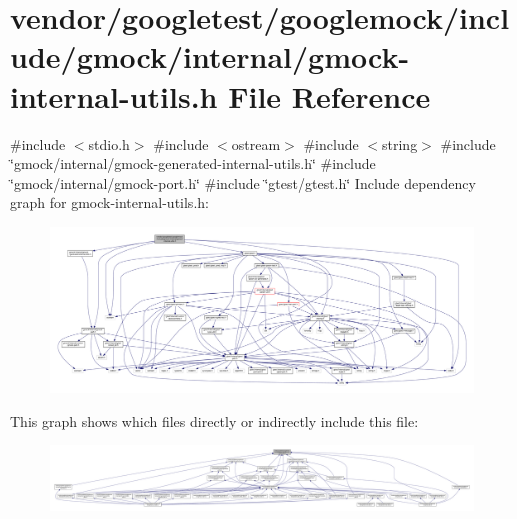 \hypertarget{gmock-internal-utils_8h}{}\section{vendor/googletest/googlemock/include/gmock/internal/gmock-\/internal-\/utils.h File Reference}
\label{gmock-internal-utils_8h}
{\ttfamily \#include $<$stdio.\+h$>$}\newline
{\ttfamily \#include $<$ostream$>$}\newline
{\ttfamily \#include $<$string$>$}\newline
{\ttfamily \#include \char`\"{}gmock/internal/gmock-\/generated-\/internal-\/utils.\+h\char`\"{}}\newline
{\ttfamily \#include \char`\"{}gmock/internal/gmock-\/port.\+h\char`\"{}}\newline
{\ttfamily \#include \char`\"{}gtest/gtest.\+h\char`\"{}}\newline
Include dependency graph for gmock-\/internal-\/utils.h\+:
\nopagebreak
\begin{figure}[H]
\begin{center}
\leavevmode
\includegraphics[width=350pt]{gmock-internal-utils_8h__incl}
\end{center}
\end{figure}
This graph shows which files directly or indirectly include this file\+:
\nopagebreak
\begin{figure}[H]
\begin{center}
\leavevmode
\includegraphics[width=350pt]{gmock-internal-utils_8h__dep__incl}
\end{center}
\end{figure}
